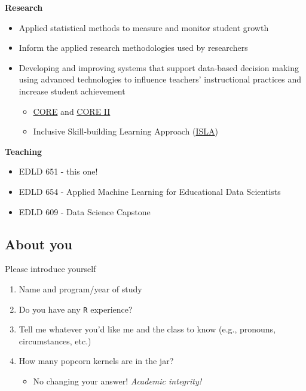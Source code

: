 \documentclass[
  letterpaper,
  DIV=11,
  numbers=noendperiod,
  oneside]{scrartcl}
\providecommand{\tightlist}{%
  \setlength{\itemsep}{0pt}\setlength{\parskip}{0pt}}\usepackage{longtable,booktabs,array}
\begin{document}
\textbf{Research}

\begin{itemize}
\tightlist
\item
  Applied statistical methods to measure and monitor student growth
\item
  Inform the applied research methodologies used by researchers
\item
  Developing and improving systems that support data-based decision
  making using advanced technologies to influence teachers'
  instructional practices and increase student achievement

  \begin{itemize}
  \tightlist
  \item
    \href{https://jnese.github.io/core-blog/}{CORE} and
    \href{https://jnese.github.io/coreprosody}{CORE II}
  \item
    Inclusive Skill-building Learning Approach
    (\href{https://blogs.uoregon.edu/neselabs/isla/}{ISLA})
  \end{itemize}
\end{itemize}

\textbf{Teaching}

\begin{itemize}
\tightlist
\item
  EDLD 651 - this one!
\item
  EDLD 654 - Applied Machine Learning for Educational Data Scientists
\item
  EDLD 609 - Data Science Capstone
\end{itemize}

\hypertarget{about-you}{%
\subsection{About you}\label{about-you}}

Please introduce yourself

\begin{enumerate}
\def\labelenumi{\arabic{enumi}.}
\tightlist
\item
  Name and program/year of study
\item
  Do you have any \texttt{R} experience?
\item
  Tell me whatever you'd like me and the class to know (e.g., pronouns,
  circumstances, etc.)
\item
  How many popcorn kernels are in the jar?

  \begin{itemize}
  \tightlist
  \item
    No changing your answer! \emph{Academic integrity!}
  \end{itemize}
\end{enumerate}
\end{document}
